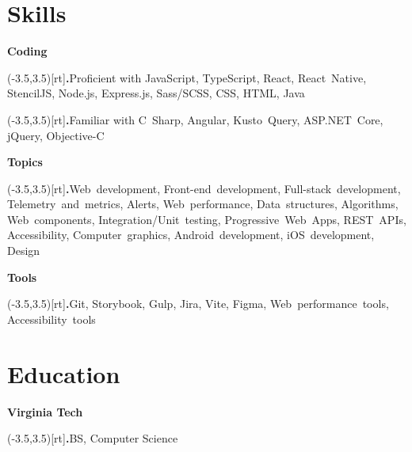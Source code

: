 \documentclass[9pt]{extarticle}
\newcommand{\BulletMark}{{\color{bulletMark}\large\bfseries.}}
\newcommand{\SideBox}[1]{\makebox(-3.5,3.5)[rt]{#1}}
\newcommand{\Bullet}[1]{\item\SideBox{\BulletMark}{\color{bullet}#1}}
\newcommand{\Bullets}[1]{\begin{trivlist}#1\end{trivlist}}
\newcommand{\Subtitle}[1]{{\color{subtitle}\large\bfseries#1}}
\newcommand{\Subsection}[2]{\Subtitle{#1}\Bullets{#2}}
\begin{document}
\begin{paracol}{2}
\begin{rightcolumn}
    \section{Skills}
      \Subsection{Coding}{
        \Bullet{Proficient with JavaScript, TypeScript, React, React~Native, StencilJS, Node.js, Express.js, Sass/SCSS, CSS, HTML, Java}
        \Bullet{Familiar with C~Sharp, Angular, Kusto~Query, ASP.NET~Core, jQuery, Objective-C}
      }
      \vfill
      \Subsection{Topics}{
        \Bullet{Web~development, Front-end~development, Full-stack~development, Telemetry~and~metrics, Alerts, Web~performance, Data~structures, Algorithms, Web~components, Integration/Unit~testing, Progressive~Web~Apps, REST~APIs, Accessibility, Computer~graphics, Android~development, iOS~development, Design}
      }
      \vfill
      \Subsection{Tools}{
        \Bullet{Git, Storybook, Gulp, Jira, Vite, Figma, Web~performance~tools, Accessibility~tools}
      }
    \vfill
    \section{Education}
      \Subsection{Virginia Tech}{
        \Bullet{BS, Computer Science}
      }
    \pagebreak
  \end{rightcolumn}
\end{paracol}
\end{document}
